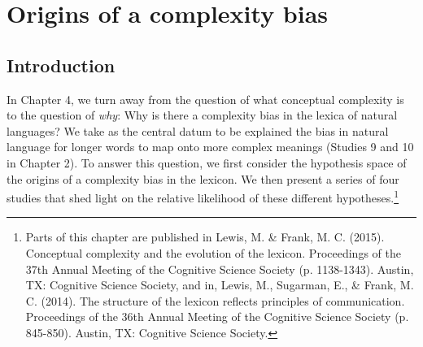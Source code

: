 
\chapter{Origins of a complexity bias}
\label{chapter:origins}

\section{Introduction}

In Chapter 4, we turn away from the question of what conceptual complexity is to the question of {\it why}: Why is there a complexity bias in the lexica of natural languages? We take as the central datum to be explained the bias in natural language for longer words to map onto more complex meanings (Studies 9 and 10 in Chapter 2).  To answer this question, we first consider the hypothesis space of the origins of a complexity bias in the lexicon. We then present a series of four studies that shed light on the relative likelihood of these different hypotheses.\footnote{Parts of this chapter are published in  Lewis, M. \& Frank, M. C. (2015). Conceptual complexity and the evolution of the lexicon. Proceedings of the 37th Annual Meeting of the Cognitive Science Society (p. 1138-1343). Austin, TX: Cognitive Science Society, and in,  Lewis, M., Sugarman, E., \& Frank, M. C. (2014). The structure of the lexicon reflects principles of communication. Proceedings of the 36th Annual Meeting of the Cognitive Science Society (p. 845-850). Austin, TX: Cognitive Science Society.}


